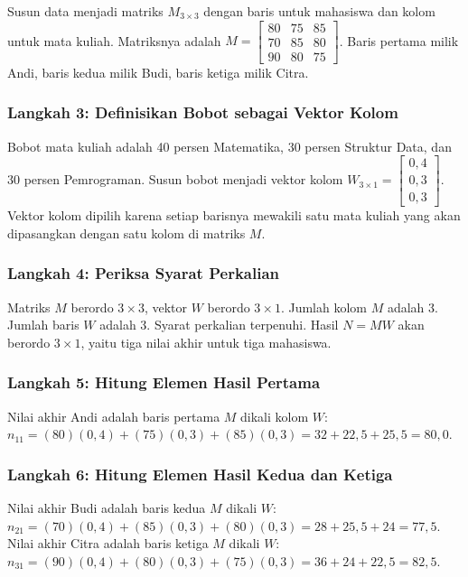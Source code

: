 \documentclass[11pt,a4paper]{article}
\begin{document}
Susun data menjadi matriks $M_{3 \times 3}$ dengan baris untuk mahasiswa dan kolom untuk mata kuliah. Matriksnya adalah $M=\begin{bmatrix}80&75&85\\70&85&80\\90&80&75\end{bmatrix}$. Baris pertama milik Andi, baris kedua milik Budi, baris ketiga milik Citra.

\subsubsection{Langkah 3: Definisikan Bobot sebagai Vektor Kolom}

Bobot mata kuliah adalah 40 persen Matematika, 30 persen Struktur Data, dan 30 persen Pemrograman. Susun bobot menjadi vektor kolom $W_{3 \times 1}=\begin{bmatrix}0{,}4\\0{,}3\\0{,}3\end{bmatrix}$. Vektor kolom dipilih karena setiap barisnya mewakili satu mata kuliah yang akan dipasangkan dengan satu kolom di matriks $M$.

\subsubsection{Langkah 4: Periksa Syarat Perkalian}

Matriks $M$ berordo $3 \times 3$, vektor $W$ berordo $3 \times 1$. Jumlah kolom $M$ adalah 3. Jumlah baris $W$ adalah 3. Syarat perkalian terpenuhi. Hasil $N=MW$ akan berordo $3 \times 1$, yaitu tiga nilai akhir untuk tiga mahasiswa.

\subsubsection{Langkah 5: Hitung Elemen Hasil Pertama}

Nilai akhir Andi adalah baris pertama $M$ dikali kolom $W$: $n_{11}=(80)(0{,}4)+(75)(0{,}3)+(85)(0{,}3)=32+22{,}5+25{,}5=80{,}0$.

\subsubsection{Langkah 6: Hitung Elemen Hasil Kedua dan Ketiga}

Nilai akhir Budi adalah baris kedua $M$ dikali $W$: $n_{21}=(70)(0{,}4)+(85)(0{,}3)+(80)(0{,}3)=28+25{,}5+24=77{,}5$. Nilai akhir Citra adalah baris ketiga $M$ dikali $W$: $n_{31}=(90)(0{,}4)+(80)(0{,}3)+(75)(0{,}3)=36+24+22{,}5=82{,}5$.
\end{document}
